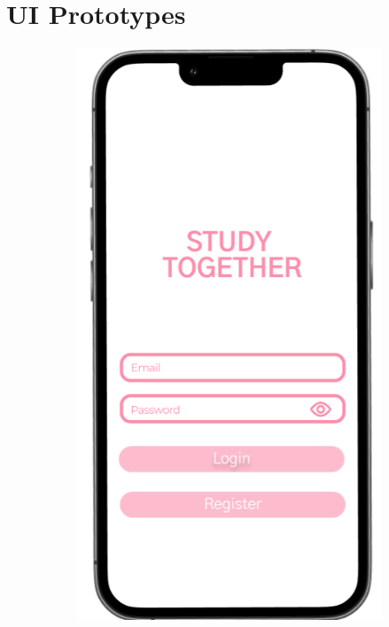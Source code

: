 \section{UI Prototypes}\label{ch:ui_prototypes}

\begin{figure}[!htbp]
  \centering
  \begin{subfigure}[b]{0.3\textwidth}
    \includegraphics[width=\textwidth]{Figures/landing.png}

\end{subfigure}
\end{figure}
